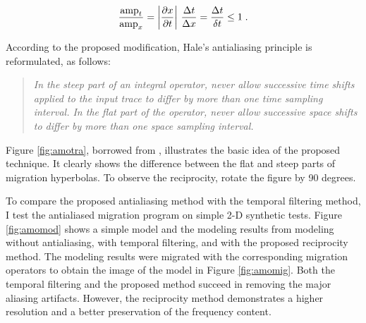\begin{equation}
{\mbox{amp}_t \over \mbox{amp}_x}=
\left|{\partial x \over \partial t}\right|\,{\Delta t \over \Delta x}=
{\Delta t \over \delta t} \leq 1\;.
\label{eqn:Jacobian}
\end{equation}

According to the proposed modification, Hale's antialiasing principle
is reformulated, as follows:
\begin{quote}
{\em In the steep part of an integral operator, never allow successive
time shifts applied to the input trace to differ by more than one time
sampling interval. In the flat part of the operator, never allow
successive space shifts to differ by more than one space sampling
interval.}
\end{quote}


Figure \ref{fig:amotra}, borrowed from ,
illustrates the basic idea of the proposed technique. It clearly shows
the difference between the flat and steep parts of migration
hyperbolas. To observe the reciprocity, rotate the figure by 90
degrees.



To compare the proposed antialiasing method with the temporal
filtering method, I test the antialiased migration program on simple
2-D synthetic tests. Figure \ref{fig:amomod} shows a simple model and
the modeling results from modeling without antialiasing, with temporal
filtering, and with the proposed reciprocity method.  The modeling
results were migrated with the corresponding migration operators to
obtain the image of the model in Figure \ref{fig:amomig}.  Both the
temporal filtering and the proposed method succeed in removing the
major aliasing artifacts. However, the reciprocity method demonstrates
a higher resolution and a better preservation of the frequency
content.



